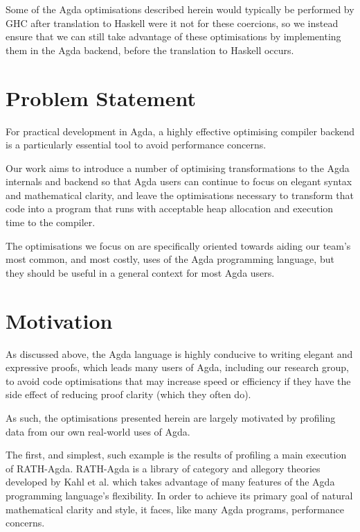 Some of the Agda optimisations described herein would typically be performed by GHC after translation to Haskell were it not for these coercions, so we instead ensure that we can still take advantage of these optimisations by implementing them in the Agda backend, before the translation to Haskell occurs.

\section{Problem Statement}
\label{sec:problem_statement}

For practical development in Agda, a highly effective optimising compiler backend is a particularly essential tool to avoid performance concerns.

Our work aims to introduce a number of optimising transformations to the Agda internals and backend so that Agda users can continue to focus on elegant syntax and mathematical clarity, and leave the optimisations necessary to transform that code into a program that runs with acceptable heap allocation and execution time to the compiler.

The optimisations we focus on are specifically oriented towards aiding our team's most common, and most costly, uses of the Agda programming language, but they should be useful in a general context for most Agda users.

\section{Motivation}
\label{sec:motivation}

As discussed above, the Agda language is highly conducive to writing elegant and expressive proofs, which leads many users of Agda, including our research group, to avoid code optimisations that may increase speed or efficiency if they have the side effect of reducing proof clarity (which they often do).

As such, the optimisations presented herein are largely motivated by profiling data from our own real-world uses of Agda.

The first, and simplest, such example is the results of profiling a main execution of RATH-Agda. RATH-Agda is a library of category and allegory theories developed by Kahl et al. which takes advantage of many features of the Agda programming language's flexibility.\cite{kahl2017} In order to achieve its primary goal of natural mathematical clarity and style, it faces, like many Agda programs, performance concerns.

